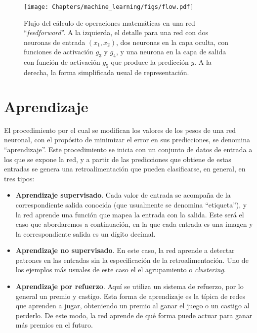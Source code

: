 \begin{figure}[t]
    \begin{center}
    \texttt{[image: Chapters/machine\_learning/figs/flow.pdf]}
\end{center}
\caption{Flujo del cálculo de operaciones matemáticas en una red ``\textit{feedforward}''. A la izquierda, el detalle para una red con dos neuronas de entrada $(x_1, x_2)$, dos neuronas en la capa oculta, con funciones de activación $g_3$ y $g_4$, y una neurona en la capa de salida con función de activación $g_5$ que produce la predicción $y$. A la derecha, la forma simplificada usual de representación.}
\label{fig:flujo}
\end{figure}


\section{Aprendizaje}

El procedimiento por el cual se modifican los valores de los pesos de una red neuronal, con el propósito de minimizar el error en sus predicciones, se denomina ``aprendizaje''. Este procedimiento se inicia con un conjunto de datos de entrada a los que se expone la red, y a partir de las predicciones que obtiene de estas entradas se genera una retroalimentación que pueden clasificarse, en general, en tres tipos:
\begin{itemize}
    \item \textbf{Aprendizaje supervisado}. Cada valor de entrada se acompaña de la correspondiente salida conocida (que usualmente se denomina ``etiqueta''), y la red aprende una función que mapea la entrada con la salida. Este será el caso que abordaremos a continuación, en la que cada entrada es una imagen y la correspondiente salida es un dígito decimal.
    \item \textbf{Aprendizaje no supervisado}. En este caso, la red aprende a detectar patrones en las entradas sin la especificación de la retroalimentación. Uno de los ejemplos más usuales de este caso el el agrupamiento o \textit{clustering}.
    \item \textbf{Aprendizaje por refuerzo}. Aquí se utiliza un sistema de refuerzo, por lo general un premio y castigo. Esta forma de aprendizaje es la típica de redes que aprenden a jugar, obteniendo un premio al ganar el juego o un castigo al perderlo. De este modo, la red aprende de qué forma puede actuar para ganar más premios en el futuro.
\end{itemize}

